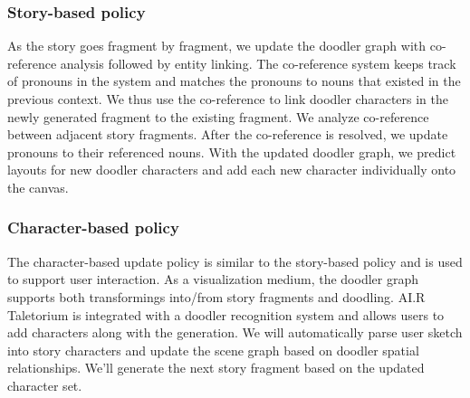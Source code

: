 \subsubsection{Story-based policy}
As the story goes fragment by fragment, we update the doodler graph with co-reference analysis followed by entity linking. The co-reference system keeps track of pronouns in the system and matches the pronouns to nouns that existed in the previous context. We thus use the co-reference to link doodler characters in the newly generated fragment to the existing fragment. We analyze co-reference between adjacent story fragments. After the co-reference is resolved, we update pronouns to their referenced nouns. With the updated doodler graph, we predict layouts for new doodler characters and add each new character individually onto the canvas.

\subsubsection{Character-based policy}
The character-based update policy is similar to the story-based policy and is used to support user interaction. As a visualization medium, the doodler graph supports both transformings into/from story fragments and doodling. AI.R Taletorium is integrated with a doodler recognition system and allows users to add characters along with the generation. We will automatically parse user sketch into story characters and update the scene graph based on doodler spatial relationships. We'll generate the next story fragment based on the updated character set.